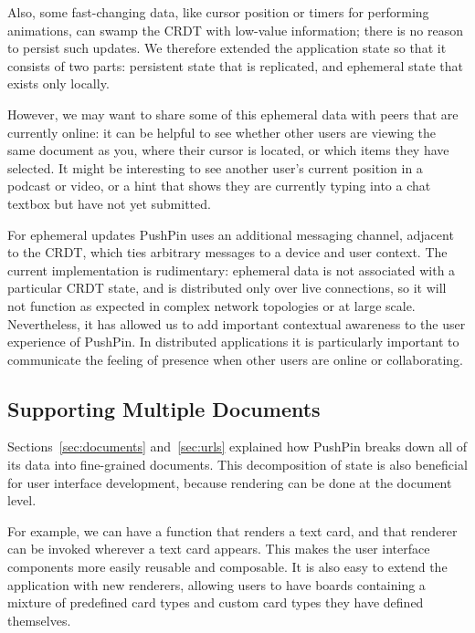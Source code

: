 \documentclass[sigplan,10pt]{acmart}
\begin{document}
Also, some fast-changing data, like cursor position or timers for performing animations, can swamp the CRDT with low-value information; there is no reason to persist such updates.
We therefore extended the application state so that it consists of two parts: persistent state that is replicated, and ephemeral state that exists only locally.

However, we may want to share some of this ephemeral data with peers that are currently online: it can be helpful to see whether other users are viewing the same document as you, where their cursor is located, or which items they have selected. It might be interesting to see another user's current position in a podcast or video, or a hint that shows they are currently typing into a chat textbox but have not yet submitted.

For ephemeral updates PushPin uses an additional messaging channel, adjacent to the CRDT, which ties arbitrary messages to a device and user context. The current implementation is rudimentary: ephemeral data is not associated with a particular CRDT state, and is distributed only over live connections, so it will not function as expected in complex network topologies or at large scale. Nevertheless, it has allowed us to add important contextual awareness to the user experience of PushPin. In distributed applications it is particularly important to communicate the feeling of presence when other users are online or collaborating.

%

\subsection{Supporting Multiple Documents}

Sections~\ref{sec:documents} and~\ref{sec:urls} explained how PushPin breaks down all of its data into fine-grained documents.
This decomposition of state is also beneficial for user interface development, because rendering can be done at the document level.

For example, we can have a function that renders a text card, and that renderer can be invoked wherever a text card appears.
This makes the user interface components more easily reusable and composable.
It is also easy to extend the application with new renderers, allowing users to have boards containing a mixture of predefined card types and custom card types they have defined themselves.
\end{document}
